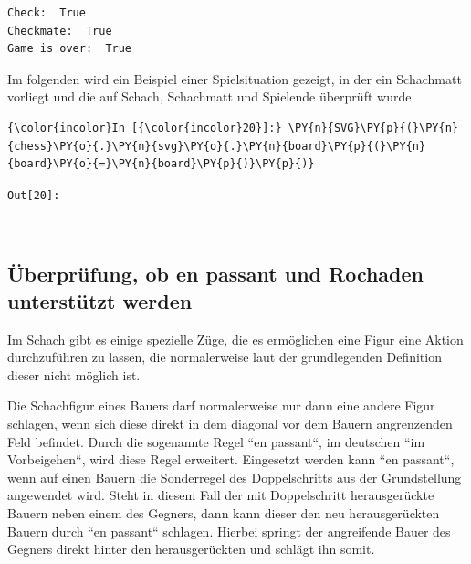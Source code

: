     \begin{Verbatim}[commandchars=\\\{\}]
Check:  True
Checkmate:  True
Game is over:  True

    \end{Verbatim}

    Im folgenden wird ein Beispiel einer Spielsituation gezeigt, in der ein
Schachmatt vorliegt und die auf Schach, Schachmatt und Spielende
überprüft wurde.

    \begin{Verbatim}[commandchars=\\\{\}]
{\color{incolor}In [{\color{incolor}20}]:} \PY{n}{SVG}\PY{p}{(}\PY{n}{chess}\PY{o}{.}\PY{n}{svg}\PY{o}{.}\PY{n}{board}\PY{p}{(}\PY{n}{board}\PY{o}{=}\PY{n}{board}\PY{p}{)}\PY{p}{)}
\end{Verbatim}

\texttt{\color{outcolor}Out[{\color{outcolor}20}]:}
    
    \begin{center}
    \end{center}
    { \hspace*{\fill} \\}
    

    \subsection{Überprüfung, ob en passant und Rochaden unterstützt
werden}\label{uxfcberpruxfcfung-ob-en-passant-und-rochaden-unterstuxfctzt-werden}

Im Schach gibt es einige spezielle Züge, die es ermöglichen eine Figur
eine Aktion durchzuführen zu lassen, die normalerweise laut der
grundlegenden Definition dieser nicht möglich ist.

Die Schachfigur eines Bauers darf normalerweise nur dann eine andere
Figur schlagen, wenn sich diese direkt in dem diagonal vor dem Bauern
angrenzenden Feld befindet. Durch die sogenannte Regel ``en passant``, im
deutschen ``im Vorbeigehen``, wird diese Regel erweitert. Eingesetzt
werden kann ``en passant``, wenn auf einen Bauern die Sonderregel des
Doppelschritts aus der Grundstellung angewendet wird. Steht in diesem
Fall der mit Doppelschritt herausgerückte Bauern neben einem des
Gegners, dann kann dieser den neu herausgerückten Bauern durch ``en
passant`` schlagen. Hierbei springt der angreifende Bauer des Gegners
direkt hinter den herausgerückten und schlägt ihn somit.

